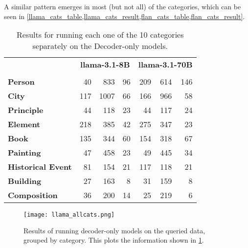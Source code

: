 A similar pattern emerges in most (but not all) of the categories, which can be seen in \cref{llama_cats_table,llama_cats_result,flan_cats_table,flan_cats_result}.

\begin{table}[htbp]
	\centering
	\footnotesize
	\begin{tabular}{>{\bfseries}l | r r r | r r r}
		\toprule
			& \multicolumn{3}{c|}{\ttfamily \bfseries llama-3.1-8B} & \multicolumn{3}{c}{\ttfamily \bfseries llama-3.1-70B} \\
			& \Parametric{} & \Contextual{} & \Other{} & \Parametric{} & \Contextual{} & \Other{} \\
		\midrule
			Person           &  40 &  833 & 96 & 209 & 614 & 146 \\
			City             & 117 & 1007 & 66 & 166 & 966 &  58 \\
			Principle        &  44 &  118 & 23 &  44 & 117 &  24 \\
			Element          & 218 &  385 & 42 & 275 & 347 &  23 \\
			Book             & 135 &  344 & 60 & 154 & 318 &  67 \\
			Painting         &  47 &  458 & 23 &  49 & 445 &  34 \\
			Historical Event &  81 &  154 & 21 & 117 & 118 &  21 \\
			Building         &  27 &  163 &  8 &  31 & 159 &   8 \\
			Composition      &  36 &  200 & 14 &  25 & 219 &   6 \\
		\bottomrule
	\end{tabular}
	\caption{Results for running each one of the 10 categories separately on the Decoder-only models.}
	\label{llama_cats_table}
\end{table}

\begin{figure}[p]
	\centering
	\texttt{[image: llama\_allcats.png]}
	\caption{Results of running decoder-only models on the queried data, grouped by category. This plots the information shown in \cref{llama_cats_table}.}
	\label{llama_cats_result}
\end{figure}

